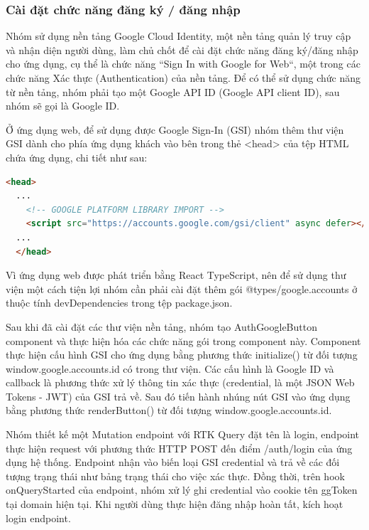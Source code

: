 \subsubsection{Cài đặt chức năng đăng ký / đăng nhập} \label{subsubsec:CaiDatDangKyDangNhap}

\tab Nhóm sử dụng nền tảng Google Cloud Identity, một nền tảng quản lý truy cập và nhận diện người dùng, làm chủ chốt để cài đặt chức năng đăng ký/đăng nhập cho ứng dụng, cụ thể là chức năng “Sign In with Google for Web“, một trong các chức năng Xác thực (Authentication) của nền tảng. Để có thể sử dụng chức năng từ nền tảng, nhóm phải tạo một Google API ID (Google API client ID), sau nhóm sẽ gọi là Google ID.
\par

Ở ứng dụng web, để sử dụng được Google Sign-In (GSI) nhóm thêm thư viện GSI dành cho phía ứng dụng khách vào bên trong thẻ <head> của tệp HTML chứa ứng dụng, chi tiết như sau:
\par

\lstset{style=mystyle}
\begin{lstlisting}[language=HTML, caption=Thêm thư viện GSI vào ứng dụng]
  <head>
  ...
    <!-- GOOGLE PLATFORM LIBRARY IMPORT -->
    <script src="https://accounts.google.com/gsi/client" async defer></script>
  ...
  </head>
\end{lstlisting}

Vì ứng dụng web được phát triển bằng React TypeScript, nên để sử dụng thư viện một cách tiện lợi nhóm cần phải cài đặt thêm gói @types/google.accounts ở thuộc tính devDependencies trong tệp package.json.

Sau khi đã cài đặt các thư viện nền tảng, nhóm tạo AuthGoogleButton component và thực hiện hóa các chức năng gói trong component này. Component thực hiện cấu hình GSI cho ứng dụng bằng phương thức initialize() từ đối tượng window.google.accounts.id có trong thư viện. Các cấu hình là Google ID và callback là phương thức xử lý thông tin xác thực (credential, là một JSON Web Tokens - JWT) của GSI trả về. Sau đó tiến hành nhúng nút GSI vào ứng dụng bằng phương thức renderButton() từ đối tượng window.google.accounts.id.

Nhóm thiết kế một Mutation endpoint với RTK Query đặt tên là login, endpoint thực hiện request với phương thức HTTP POST đến điểm /auth/login của ứng dụng hệ thống. Endpoint nhận vào biến loại GSI credential và trả về các đối tượng trạng thái như bảng trạng thái cho việc xác thực. Đồng thời, trên hook onQueryStarted của endpoint, nhóm xử lý ghi credential vào cookie tên ggToken tại domain hiện tại. Khi người dùng thực hiện đăng nhập hoàn tất, kích hoạt login endpoint.

